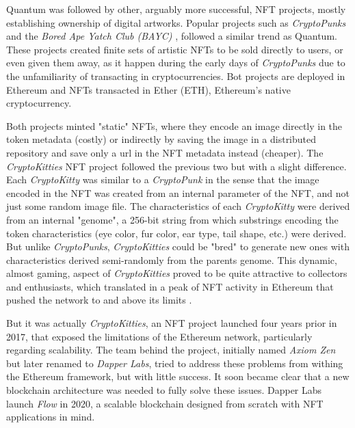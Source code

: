 \documentclass[../main.tex]{subfiles}
\begin{document}
Quantum was followed by other, arguably more successful, NFT projects, mostly establishing ownership of digital artworks. Popular projects such as \textit{CryptoPunks} \cite{nftnow2024} and the \textit{Bored Ape Yatch Club (BAYC)} \cite{Thomas2022}, followed a similar trend as Quantum. These projects created finite sets of artistic NFTs to be sold directly to users, or even given them away, as it happen during the early days of \textit{CryptoPunks} due to the unfamiliarity of transacting in cryptocurrencies. Bot projects are deployed in Ethereum and NFTs transacted in Ether (ETH), Ethereum's native cryptocurrency.
\par
Both projects minted "static" NFTs, where they encode an image directly in the token metadata (costly) or indirectly by saving the image in a distributed repository and save only a url in the NFT metadata instead (cheaper). The \textit{CryptoKitties} NFT project \cite{Dapper2017} followed the previous two but with a slight difference. Each \textit{CryptoKitty} was similar to a \textit{CryptoPunk} in the sense that the image encoded in the NFT was created from an internal parameter of the NFT, and not just some random image file. The characteristics of each \textit{CryptoKitty} were derived from an internal "genome", a 256-bit string from which substrings encoding the token characteristics (eye color, fur color, ear type, tail shape, etc.) were derived. But unlike \textit{CryptoPunks}, \textit{CryptoKitties} could be "bred" to generate new ones with characteristics derived semi-randomly from the parents genome. This dynamic, almost gaming, aspect of \textit{CryptoKitties} proved to be quite attractive to collectors and enthusiasts, which translated in a peak of NFT activity in Ethereum that pushed the network to and above its limits \cite{bbc2017}.
\par
But it was actually \textit{CryptoKitties}, an NFT project launched four years prior in 2017, that exposed the limitations of the Ethereum network, particularly regarding scalability. The team behind the project, initially named \textit{Axiom Zen} but later renamed to \textit{Dapper Labs}, tried to address these problems from withing the Ethereum framework, but with little success. It soon became clear that a new blockchain architecture was needed to fully solve these issues. Dapper Labs launch \textit{Flow} in 2020, a scalable blockchain designed from scratch with NFT applications in mind.
\par
\end{document}
